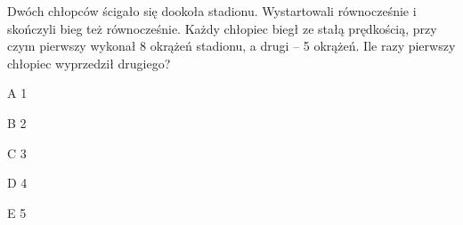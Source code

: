 \begin{tresc}
Dwóch chłopców ścigało się dookoła stadionu. Wystartowali równocześnie i skończyli bieg też równocześnie. Każdy chłopiec biegł ze stałą prędkością, przy czym pierwszy wykonał 8 okrążeń stadionu, a drugi – 5 okrążeń. Ile razy pierwszy chłopiec wyprzedził drugiego?
\end{tresc}
\begin{wariant}{A} 1 \end{wariant}
\begin{wariant}{B} 2 \end{wariant}
\begin{wariant}{C} 3 \end{wariant}
\begin{wariant}{D} 4 \end{wariant}
\begin{wariant}{E} 5 \end{wariant}
